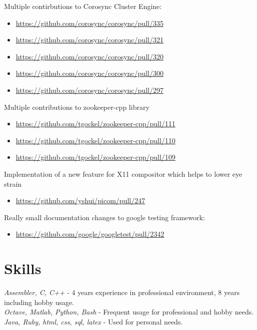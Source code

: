 \documentclass[12]{article}
\begin{document}
{
Multiple contirbutions to Corosync Cluster Engine:
\begin{itemize}
	\item \url{https://github.com/corosync/corosync/pull/335}
	\item \url{https://github.com/corosync/corosync/pull/321}
	\item \url{https://github.com/corosync/corosync/pull/320}
	\item \url{https://github.com/corosync/corosync/pull/300}
	\item \url{https://github.com/corosync/corosync/pull/297}
\end{itemize}
}

{
Multiple contributions to zookeeper-cpp library
\begin{itemize}
	\item \url{https://github.com/tgockel/zookeeper-cpp/pull/111}
	\item \url{https://github.com/tgockel/zookeeper-cpp/pull/110}
	\item \url{https://github.com/tgockel/zookeeper-cpp/pull/109}
\end{itemize}
}

{
Implementation of a new feature for X11 compositor which helps to lower eye strain
\begin{itemize}
	\item \url{https://github.com/yshui/picom/pull/247}
\end{itemize}
}

{
Really small documentation changes to google testing framework:
\begin{itemize}
	\item \url{https://github.com/google/googletest/pull/2342}
\end{itemize}
}










\section{Skills}

{
	\textit{Assembler, C, C++} - 4 years experience in professional environment, 8 years including hobby usage.\\
	\textit{Octave, Matlab, Python, Bash} - Frequent usage for professional and hobby needs.\\
	\textit{Java, Ruby, html, css, sql, latex} - Used for personal needs. \\

}
\end{document}
